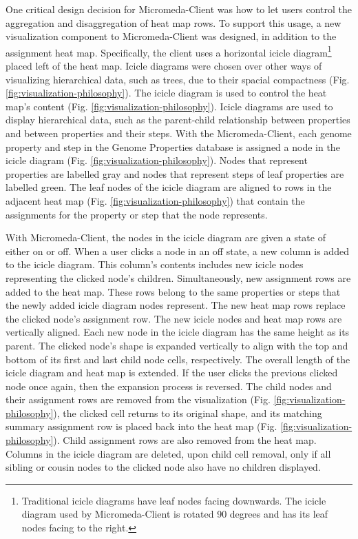 One critical design decision for Micromeda-Client was how to let users control 
the aggregation and disaggregation of heat map rows. To support this 
usage, a new visualization component to Micromeda-Client was designed, in 
addition to the assignment heat map. Specifically, the client uses a horizontal 
icicle diagram\footnote{Traditional icicle diagrams have leaf nodes facing 
downwards. The icicle diagram used by Micromeda-Client is rotated 90 degrees and 
has its leaf nodes facing to the right.} placed left of the heat map. Icicle 
diagrams were chosen over other ways of visualizing hierarchical data, such as 
trees, due to their spacial compactness (Fig. 
\ref{fig:visualization-philosophy}). The icicle diagram is used to control the 
heat map's content (Fig. \ref{fig:visualization-philosophy}). Icicle diagrams 
are used to display hierarchical data, such as the parent-child relationship 
between properties and between properties and their steps. With the 
Micromeda-Client, each genome property and step in the Genome Properties 
database is assigned a node in the icicle diagram (Fig. 
\ref{fig:visualization-philosophy}). Nodes that represent properties are 
labelled gray and nodes that represent steps of leaf properties are labelled 
green. The leaf nodes of the icicle diagram are aligned to rows in the adjacent 
heat map (Fig. \ref{fig:visualization-philosophy}) that contain the assignments 
for the property or step that the node represents.

With Micromeda-Client, the nodes in the icicle diagram are given a state of 
either on or off. When a user clicks a node in an off state, a new column is 
added to the icicle diagram. This column's contents includes new icicle nodes 
representing the clicked node's children. Simultaneously, new assignment rows 
are added to the heat map. These rows belong to the same properties or steps 
that the newly added icicle diagram nodes represent. The new heat map rows 
replace the clicked node's assignment row. The new icicle nodes and heat map 
rows are vertically aligned. Each new node in the icicle diagram has the same 
height as its parent. The clicked node's shape is expanded vertically to align 
with the top and bottom of its first and last child node cells, respectively. 
The overall length of the icicle diagram and heat map is extended. If the user 
clicks the previous clicked node once again, then the expansion process 
is reversed. The child nodes and their assignment rows are removed from the 
visualization (Fig. \ref{fig:visualization-philosophy}), the clicked cell 
returns to its original shape, and its matching summary assignment row is placed 
back into the heat map (Fig. \ref{fig:visualization-philosophy}). Child 
assignment rows are also removed from the heat map. Columns in the icicle 
diagram are deleted, upon child cell removal, only if all sibling or cousin 
nodes to the clicked node also have no children displayed.

